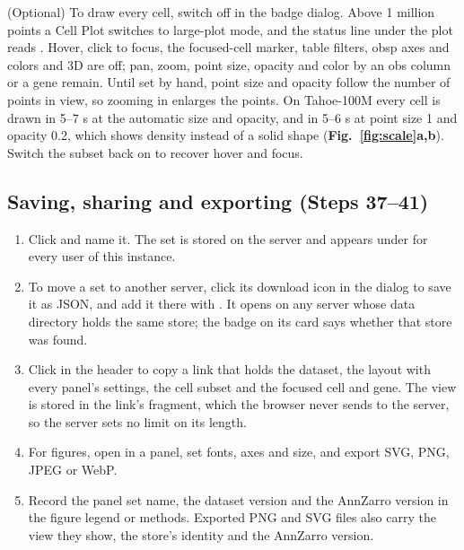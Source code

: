 \begin{enumerate}
  (Optional) To draw every cell, switch off  in the badge dialog. Above 1 million points a Cell Plot switches to large-plot mode, and the status line under the plot reads . Hover, click to focus, the focused-cell marker, table filters, obsp axes and colors and 3D are off; pan, zoom, point size, opacity and color by an obs column or a gene remain. Until set by hand, point size and opacity follow the number of points in view, so zooming in enlarges the points. On Tahoe-100M every cell is drawn in 5--7 s at the automatic size and opacity, and in 5--6 s at point size 1 and opacity 0.2, which shows density instead of a solid shape (\textbf{Fig.~\ref{fig:scale}a,b}). Switch the subset back on to recover hover and focus.
\troubleshoot{}
\end{enumerate}

\subsection{Saving, sharing and exporting (Steps 37--41)}

\begin{enumerate}
\def\labelenumi{\arabic{enumi}.}
\setcounter{enumi}{36}
\tightlist
\item
  Click  and name it. The set is stored on the server and appears under  for every user of this instance.
\troubleshoot{}
\item
  To move a set to another server, click its download icon in the  dialog to save it as JSON, and add it there with . It opens on any server whose data directory holds the same store; the badge on its card says whether that store was found.
\item
  Click  in the header to copy a link that holds the dataset, the layout with every panel's settings, the cell subset and the focused cell and gene. The view is stored in the link's fragment, which the browser never sends to the server, so the server sets no limit on its length.
\item
  For figures, open  in a panel, set fonts, axes and size, and export SVG, PNG, JPEG or WebP.
\item
  Record the panel set name, the dataset version and the AnnZarro version in the figure legend or methods. Exported PNG and SVG files also carry the view they show, the store's identity and the AnnZarro version.
\end{enumerate}

